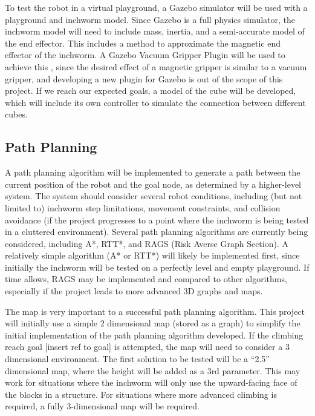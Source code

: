 To test the robot in a virtual playground, a Gazebo simulator will be used with a playground and inchworm model. Since Gazebo is a full physics simulator, the inchworm model will need to include mass, inertia, and a semi-accurate model of the end effector. This includes a method to approximate the magnetic end effector of the inchworm. A Gazebo Vacuum Gripper Plugin will be used to achieve this \cite{GazeboVacuumGripper}\cite{MagnetFeetAnswers}, since the desired effect of a magnetic gripper is similar to a vacuum gripper, and developing a new plugin for Gazebo is out of the scope of this project. If we reach our expected goals, a model of the cube will be developed, which will include its own controller to simulate the connection between different cubes.

\subsection{Path Planning}
A path planning algorithm will be implemented to generate a path between the current position of the robot and the goal node, as determined by a higher-level system. The system should consider several robot conditions, including (but not limited to) inchworm step limitations, movement constraints, and collision avoidance \cite{CollisionAvoidance} (if the project progresses to a point where the inchworm is being tested in a cluttered environment). Several path planning algorithms are currently being considered, including A*, RTT*\cite{RT_RTT}, and RAGS (Risk Averse Graph Section). A relatively simple algorithm (A* or RTT*) will likely be implemented first, since initially the inchworm will be tested on a perfectly level and empty playground. If time allows, RAGS \cite{RAGS} may be implemented and compared to other algorithms, especially if the project leads to more advanced 3D graphs and maps.

The map is very important to a successful path planning algorithm. This project will initially use a simple 2 dimensional map (stored as a graph) to simplify the initial implementation of the path planning algorithm developed. If the climbing reach goal [insert ref to goal] is attempted, the map will need to consider a 3 dimensional environment. The first solution to be tested will be a “2.5” dimensional map, where the height will be added as a 3rd parameter. This may work for situations where the inchworm will only use the upward-facing face of the blocks in a structure. For situations where more advanced climbing is required, a fully 3-dimensional map will be required.

